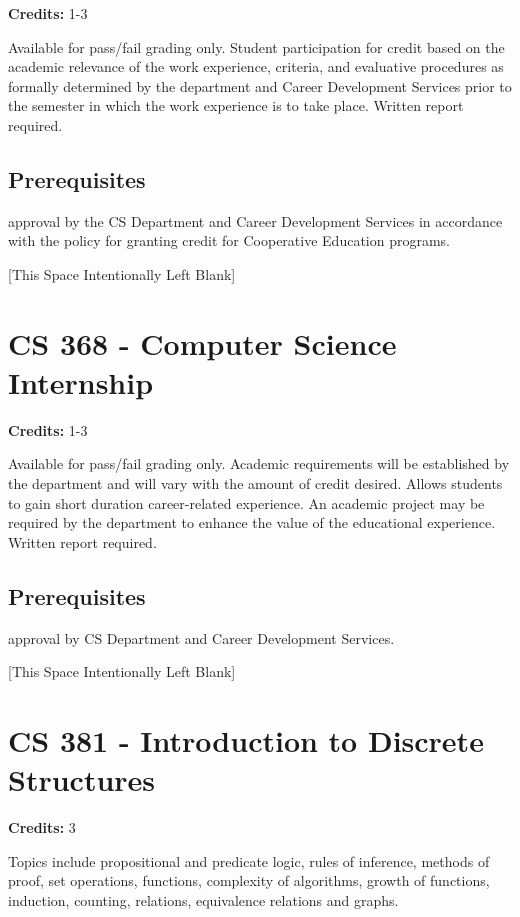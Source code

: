 \documentclass[]{article}
\newcommand{\pagebreakhere}{
\vspace*{\fill}
\begin{center}
[This Space Intentionally Left Blank]
\end{center}
\vspace*{\fill}
\newpage
}
\begin{document}
\textbf{Credits:} 1-3

Available for pass/fail grading only. Student participation for credit
based on the academic relevance of the work experience, criteria, and
evaluative procedures as formally determined by the department and
Career Development Services prior to the semester in which the work
experience is to take place. Written report required.

\subsection{Prerequisites}\label{prerequisites-20}

approval by the CS Department and Career Development Services in
accordance with the policy for granting credit for Cooperative Education
programs.

\pagebreakhere
\section{CS 368 - Computer Science
Internship}\label{cs-368---computer-science-internship}

\textbf{Credits:} 1-3

Available for pass/fail grading only. Academic requirements will be
established by the department and will vary with the amount of credit
desired. Allows students to gain short duration career-related
experience. An academic project may be required by the department to
enhance the value of the educational experience. Written report
required.

\subsection{Prerequisites}\label{prerequisites-21}

approval by CS Department and Career Development Services.

\pagebreakhere
\section{CS 381 - Introduction to Discrete
Structures}\label{cs-381---introduction-to-discrete-structures}

\textbf{Credits:} 3

Topics include propositional and predicate logic, rules of inference,
methods of proof, set operations, functions, complexity of algorithms,
growth of functions, induction, counting, relations, equivalence
relations and graphs.
\end{document}
